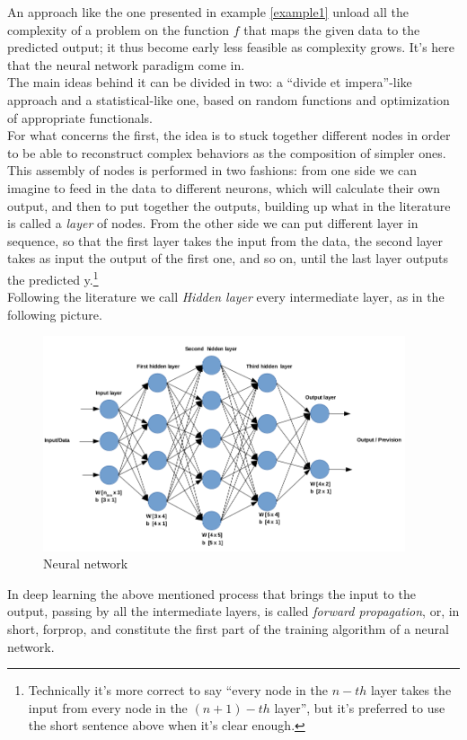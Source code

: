 \documentclass[12pt, a4paper]{report}
\theoremstyle{definition}
\begin{document}
\noindent An approach like the one presented in example \ref{example1} unload all the complexity of a problem on the function $f$ that maps the given data to the predicted output; it thus become early less feasible as complexity grows. It's here that the neural network paradigm come in.\\
The main ideas behind it can be divided in two: a ``divide et impera''-like approach and a statistical-like one, based on random functions and optimization of appropriate functionals.\\
For what concerns the first, the idea is to stuck together different nodes in order to be able to reconstruct complex behaviors as the composition of simpler ones. This assembly of nodes is performed in two fashions: from one side we can imagine to feed in the data to different neurons, which will calculate their own output, and then to put together the outputs, building up what in the literature is called a \textit{layer} of nodes. From the other side we can put different layer in sequence, so that the first layer takes the input from the data, the second layer takes as input the output of the first one, and so on, until the last layer outputs the predicted y.\footnote{Technically it's more correct to say ``every node in the $n\!-\!th$ layer takes the input from every node in the $(n+1)\!-\!th$ layer'', but it's preferred to use the short sentence above when it's clear enough.}\\
Following the literature we call \textit{Hidden layer} every intermediate layer, as in the following picture.
\begin{figure}[H]
\centering
\includegraphics[width=0.95\textwidth]{img/neuralnet}
\caption{Neural network}\label{neuralnet}
\end{figure}
\noindent In deep learning the above mentioned process that brings the input to the output, passing by all the intermediate layers, is called \textit{forward propagation}, or, in short, forprop, and constitute the first part of the training algorithm of a neural network.\\
\end{document}
